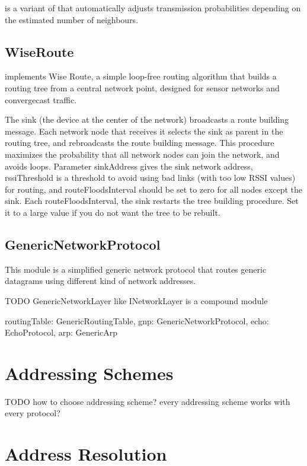  is a variant of
 that automatically adjusts transmission
probabilities depending on the estimated number of neighbours.

\subsection{WiseRoute}

 implements Wise Route, a simple loop-free routing algorithm
that builds a routing tree from a central network point, designed for sensor
networks and convergecast traffic.

The sink (the device at the center of the network) broadcasts
a route building message. Each network node that receives it
selects the sink as parent in the routing tree, and rebroadcasts
the route building message. This procedure maximizes the probability
that all network nodes can join the network, and avoids loops.
Parameter sinkAddress gives the sink network address,
rssiThreshold is a threshold to avoid using bad links (with too low
RSSI values) for routing, and routeFloodsInterval should be set to
zero for all nodes except the sink. Each routeFloodsInterval, the
sink restarts the tree building procedure. Set it to a large value
if you do not want the tree to be rebuilt.

\subsection{GenericNetworkProtocol}

This module is a simplified generic network protocol that routes
generic datagrams using different kind of network addresses. 

TODO GenericNetworkLayer like INetworkLayer  is a compound module

routingTable: GenericRoutingTable,
gnp: GenericNetworkProtocol,
echo: EchoProtocol,
arp: GenericArp



\section{Addressing Schemes}

TODO how to choose addressing scheme?  every addressing scheme works with every protocol?
  
\section{Address Resolution}

